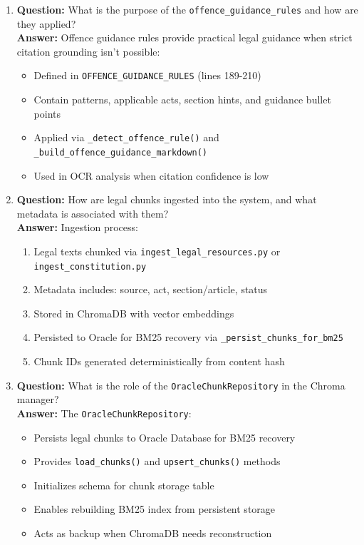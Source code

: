 \documentclass[11pt]{article}
\begin{document}
\begin{enumerate}
\item \textbf{Question:} What is the purpose of the \texttt{offence\_guidance\_rules} and how are they applied?
\\ \textbf{Answer:} Offence guidance rules provide practical legal guidance when strict citation grounding isn't possible:
\begin{itemize}
\item Defined in \texttt{OFFENCE\_GUIDANCE\_RULES} (lines 189-210)
\item Contain patterns, applicable acts, section hints, and guidance bullet points
\item Applied via \texttt{\_detect\_offence\_rule()} and \texttt{\_build\_offence\_guidance\_markdown()}
\item Used in OCR analysis when citation confidence is low
\end{itemize}

\item \textbf{Question:} How are legal chunks ingested into the system, and what metadata is associated with them?
\\ \textbf{Answer:} Ingestion process:
\begin{enumerate}
\item Legal texts chunked via \texttt{ingest\_legal\_resources.py} or \texttt{ingest\_constitution.py}
\item Metadata includes: source, act, section/article, status
\item Stored in ChromaDB with vector embeddings
\item Persisted to Oracle for BM25 recovery via \texttt{\_persist\_chunks\_for\_bm25}
\item Chunk IDs generated deterministically from content hash
\end{enumerate}

\item \textbf{Question:} What is the role of the \texttt{OracleChunkRepository} in the Chroma manager?
\\ \textbf{Answer:} The \texttt{OracleChunkRepository}:
\begin{itemize}
\item Persists legal chunks to Oracle Database for BM25 recovery
\item Provides \texttt{load\_chunks()} and \texttt{upsert\_chunks()} methods
\item Initializes schema for chunk storage table
\item Enables rebuilding BM25 index from persistent storage
\item Acts as backup when ChromaDB needs reconstruction
\end{itemize}


\end{enumerate}
\end{document}
